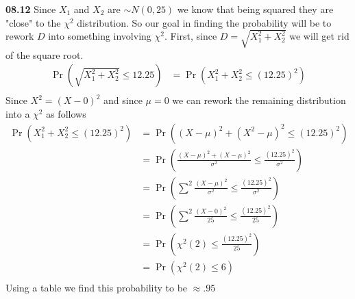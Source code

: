 

{\bf 08.12} Since $X_1$ and $X_2$ are $\sim N(0,25)$ we know that being squared they are "close" to the $\chi^2$
distribution. So our goal in finding the probability will be to rework $D$ into something involving $\chi^2$.
First, since $D = \sqrt{X^2_1 + X^2_2}$ we will get rid of the square root. \\
\begin{align*}
	\Pr \left( \sqrt{X^2_1 + X^2_2} \leq 12.25 \right) & = 	\Pr \left( X^2_1 + X^2_2 \leq (12.25)^2 \right) \\
\end{align*}
Since $X^2 = (X - 0)^2$ and since $\mu = 0$ we can rework the remaining distribution into a $\chi^2$ as follows
\begin{align*}
	\Pr \left( X^2_1 + X^2_2 \leq (12.25)^2 \right) & = \Pr \left( (X - \mu)^2  + (X^2- \mu)^2 \leq (12.25)^2  \right) \\
	& = \Pr \left( \frac{(X - \mu)^2  + (X- \mu)^2}{\sigma^2} \leq \frac{(12.25)^2 }{\sigma^2} \right) \\
	& = \Pr \left( \sum^{2}\frac{(X - \mu)^2}{\sigma^2} \leq \frac{(12.25)^2 }{\sigma^2} \right) \\
	& = \Pr \left( \sum^{2}\frac{(X - 0)^2}{25} \leq \frac{(12.25)^2 }{25} \right) \\
	& = \Pr \left( \chi^2 (2) \leq \frac{(12.25)^2}{25} \right) \\
	& = \Pr \left( \chi^2 (2) \leq  6 \right) \\
\end{align*}
Using a table we find this probability to be $\approx .95$


